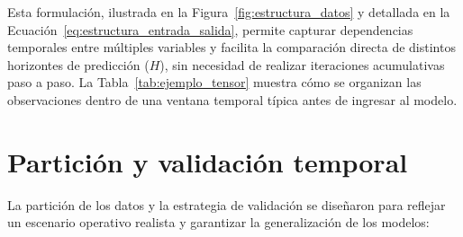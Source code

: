 \noindent
Esta formulación, ilustrada en la Figura~\ref{fig:estructura_datos} y detallada en la Ecuación~\eqref{eq:estructura_entrada_salida}, permite capturar dependencias temporales entre múltiples variables y facilita la comparación directa de distintos horizontes de predicción ($H$), sin necesidad de realizar iteraciones acumulativas paso a paso. La Tabla~\ref{tab:ejemplo_tensor} muestra cómo se organizan las observaciones dentro de una ventana temporal típica antes de ingresar al modelo.




\section{Partición y validación temporal}
\label{sec:particion_validacion}

La partición de los datos y la estrategia de validación se diseñaron para reflejar un escenario operativo realista y garantizar la generalización de los modelos:

